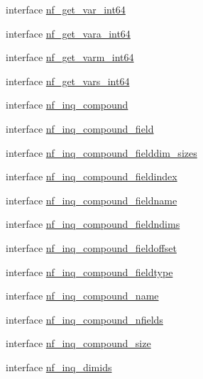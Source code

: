 \begin{DoxyCompactItemize}
\item 
interface \hyperlink{interfacenetcdf4__nf__interfaces_1_1nf__get__var__int64}{nf\+\_\+get\+\_\+var\+\_\+int64}
\item 
interface \hyperlink{interfacenetcdf4__nf__interfaces_1_1nf__get__vara__int64}{nf\+\_\+get\+\_\+vara\+\_\+int64}
\item 
interface \hyperlink{interfacenetcdf4__nf__interfaces_1_1nf__get__varm__int64}{nf\+\_\+get\+\_\+varm\+\_\+int64}
\item 
interface \hyperlink{interfacenetcdf4__nf__interfaces_1_1nf__get__vars__int64}{nf\+\_\+get\+\_\+vars\+\_\+int64}
\item 
interface \hyperlink{interfacenetcdf4__nf__interfaces_1_1nf__inq__compound}{nf\+\_\+inq\+\_\+compound}
\item 
interface \hyperlink{interfacenetcdf4__nf__interfaces_1_1nf__inq__compound__field}{nf\+\_\+inq\+\_\+compound\+\_\+field}
\item 
interface \hyperlink{interfacenetcdf4__nf__interfaces_1_1nf__inq__compound__fielddim__sizes}{nf\+\_\+inq\+\_\+compound\+\_\+fielddim\+\_\+sizes}
\item 
interface \hyperlink{interfacenetcdf4__nf__interfaces_1_1nf__inq__compound__fieldindex}{nf\+\_\+inq\+\_\+compound\+\_\+fieldindex}
\item 
interface \hyperlink{interfacenetcdf4__nf__interfaces_1_1nf__inq__compound__fieldname}{nf\+\_\+inq\+\_\+compound\+\_\+fieldname}
\item 
interface \hyperlink{interfacenetcdf4__nf__interfaces_1_1nf__inq__compound__fieldndims}{nf\+\_\+inq\+\_\+compound\+\_\+fieldndims}
\item 
interface \hyperlink{interfacenetcdf4__nf__interfaces_1_1nf__inq__compound__fieldoffset}{nf\+\_\+inq\+\_\+compound\+\_\+fieldoffset}
\item 
interface \hyperlink{interfacenetcdf4__nf__interfaces_1_1nf__inq__compound__fieldtype}{nf\+\_\+inq\+\_\+compound\+\_\+fieldtype}
\item 
interface \hyperlink{interfacenetcdf4__nf__interfaces_1_1nf__inq__compound__name}{nf\+\_\+inq\+\_\+compound\+\_\+name}
\item 
interface \hyperlink{interfacenetcdf4__nf__interfaces_1_1nf__inq__compound__nfields}{nf\+\_\+inq\+\_\+compound\+\_\+nfields}
\item 
interface \hyperlink{interfacenetcdf4__nf__interfaces_1_1nf__inq__compound__size}{nf\+\_\+inq\+\_\+compound\+\_\+size}
\item 
interface \hyperlink{interfacenetcdf4__nf__interfaces_1_1nf__inq__dimids}{nf\+\_\+inq\+\_\+dimids}

\end{DoxyCompactItemize}
